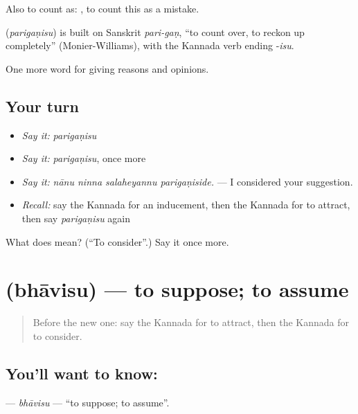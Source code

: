 Also to count as:    , to count this as a mistake.

\begin{cousinweb}
\textbf{} (\emph{parigaṇisu}) is built on Sanskrit \emph{pari-gaṇ}, \textquotedblleft{}to count over, to reckon up completely\textquotedblright{} (Monier-Williams), with the Kannada verb ending -\emph{isu}.
\end{cousinweb}

\begin{grammarlens}[title={What you've built}]
One more word for giving reasons and opinions.
\end{grammarlens}

\subsection*{Your turn}
\begin{itemize}
\raggedright
  \item \emph{Say it:} \emph{parigaṇisu}
  \item \emph{Say it:} \emph{parigaṇisu}, once more
  \item \emph{Say it:} \emph{nānu ninna salaheyannu parigaṇiside.} — I considered your suggestion.
  \item \emph{Recall:} say the Kannada for an inducement, then the Kannada for to attract, then say \emph{parigaṇisu} again
\end{itemize}

\begin{tcolorbox}[breakable,colback=teal!4,colframe=teal!35!black,title={Before you move on}]
What does  mean? (\textquotedblleft{}To consider\textquotedblright{}.) Say it once more.
\end{tcolorbox}
\section[\texorpdfstring{\kn{ಭಾವಿಸು} (bhāvisu)}{ಭಾವಿಸು (bhāvisu)}]{ (bhāvisu) — to suppose; to assume}

\label{lesson:KA-C381-bhavisu}



\begin{quote}
Before the new one: say the Kannada for to attract, then the Kannada for to consider.
\end{quote}

\subsection*{You'll want to know: }
\textbf{} — \emph{bhāvisu} — \textquotedblleft{}to suppose; to assume\textquotedblright{}.

